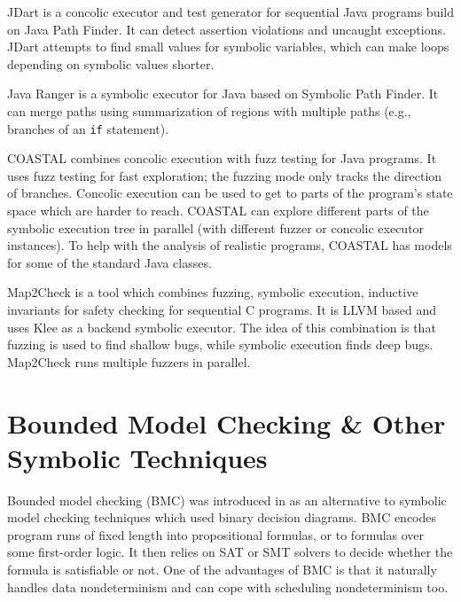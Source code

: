 JDart  is a concolic executor and test generator for sequential Java programs build on Java Path Finder.
It can detect assertion violations and uncaught exceptions.
JDart attempts to find small values for symbolic variables, which can make loops depending on symbolic values shorter.

Java Ranger  is a symbolic executor for Java based on Symbolic Path Finder.
It can merge paths using summarization of regions with multiple paths (e.g., branches of an \texttt{if} statement). %

COASTAL  combines concolic execution with fuzz testing for Java programs.
It uses fuzz testing for fast exploration; the fuzzing mode only tracks the direction of branches.
Concolic execution can be used to get to parts of the program's state space which are harder to reach.
COASTAL can explore different parts of the symbolic execution tree in parallel (with different fuzzer or concolic executor instances).
To help with the analysis of realistic programs, COASTAL has models for some of the standard Java classes. %

Map2Check  is a tool which combines fuzzing, symbolic execution, inductive invariants for safety checking for sequential C programs.
It is LLVM based and uses Klee as a backend symbolic executor.
The idea of this combination is that fuzzing is used to find shallow bugs, while symbolic execution finds deep bugs.
Map2Check runs multiple fuzzers in parallel.



\section{Bounded Model Checking \& Other Symbolic Techniques}\label{sec:stateoftheart:bmc}

Bounded model checking (BMC) was introduced in  as an alternative to
symbolic model checking techniques which used binary decision diagrams.
BMC encodes program runs of fixed length into propositional formulas, or to
formulas over some first-order logic.
It then relies on SAT or SMT solvers to decide whether the formula is satisfiable
or not.
One of the advantages of BMC is that it naturally handles data nondeterminism and can cope with scheduling nondeterminism too.

